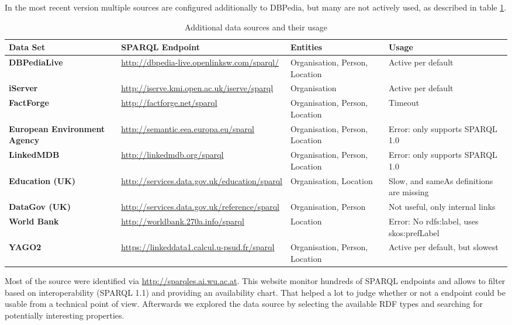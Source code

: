 In the most recent version multiple sources are configured additionally to DBPedia, but many are not actively used, as described in table \ref{tab:sources}.
\begin{table}[H]
	\begin{tabular*}{\textwidth}{p{}|p{}|p{} |p{3cm}}
		
		\textbf{Data Set} &\small \textbf{SPARQL Endpoint} & \textbf{Entities} & \textbf{Usage}  \\
		\hline 
		\textbf{DBPediaLive} &\small \url{http://dbpedia-live.openlinksw.com/sparql/} & Organisation, Person, Location  & Active per default\\
		\hline 
		\textbf{iServer} &\small \url{http://iserve.kmi.open.ac.uk/iserve/sparql} & Organisation & Active per default \\
		\hline 
		\textbf{FactForge} &\small \url{http://factforge.net/sparql} & Organisation, Person, Location & Timeout \\
		\hline 
		\textbf{European Environment Agency} &\small \url{http://semantic.eea.europa.eu/sparql} &  Organisation, Person, Location  & Error: only supports SPARQL 1.0  \\
		\hline   
		\textbf{LinkedMDB} &\small \url{http://linkedmdb.org/sparql} &  Organisation, Person, Location  & Error: only supports SPARQL 1.0 \\
		\hline 
		\textbf{Education (UK)} & \small \url{http://services.data.gov.uk/education/sparql} &  Organisation, Location  & Slow, and sameAs definitions are missing \\
		\hline 
		\textbf{DataGov (UK)} &\small \url{http://services.data.gov.uk/reference/sparql} &  Organisation, Person  & Not useful, only internal links\\
		\hline 
		\textbf{World Bank} &\small \url{http://worldbank.270a.info/sparql} &  Location & Error: No rdfs:label, uses skos:prefLabel \\
		\hline 
		\textbf{YAGO2} &\small \url{https://linkeddata1.calcul.u-psud.fr/sparql} &  Organisation, Person, Location & Active per default, but slowest \\
	\end{tabular*}
	\caption{Additional data sources and their usage}
	\label{tab:sources}
\end{table}

Most of the source were identified via \url{http://sparqles.ai.wu.ac.at}. This website monitor hundreds of SPARQL endpoints and allows to filter based on interoperability (SPARQL 1.1) and providing an availability chart. That helped a lot to judge whether or not a endpoint could be usable from a technical point of view. Afterwards we explored the data source by selecting the available RDF types and searching for potentially interesting properties. 